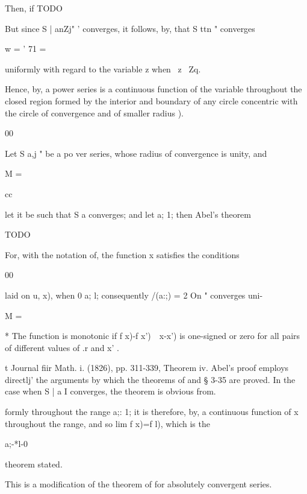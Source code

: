 Then, if
TODO

But since S | anZj" ' converges, it follows, by, that S ttn "
converges

w = ' 71 =

uniformly with regard to the variable z when \ z \ Zq.

Hence, by, a power series is a continuous function of the
variable throughout the closed region formed by the interior and
boundary of any circle concentric with the circle of convergence and
of smaller radius ).


00

Let S a,j " be a po ver series, whose radius of convergence is unity,
and

M =

cc

let it be such that S a converges; and let a; 1; then Abel's theorem

TODO

For, with the notation of, the function x satisfies the
conditions

00

laid on u, x), when 0 a; l; consequently /(a:;) = 2 On " converges
uni-

M =

* The function is monotonic if f x)-f x')\ \ x-x') is one-signed or
zero for all pairs of different values of .r and x' .

t Journal fiir Math. i. (1826), pp. 311-339, Theorem iv. Abel's proof
employs directlj' the arguments by which the theorems of and §
3-35 are proved. In the case when S | a I converges, the theorem is
obvious from.

%
%

formly throughout the range a;: 1; it is therefore, by, a
continuous function of x throughout the range, and so lim f x)=f l),
which is the

a;-*l-0

theorem stated.


This is a modification of the theorem of for absolutely
convergent series.

